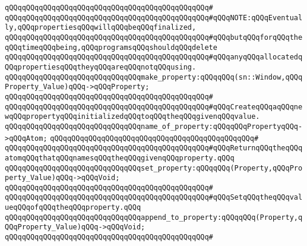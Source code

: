 \verb|qQQqqQQqqQQqqQQqqQQqqQQqqQQqqQQqqQQqqQQqqQQqqQQq#|\newline
\verb|qQQqqQQqqQQqqQQqqQQqqQQqqQQqqQQqqQQqqQQqqQQqqQQq#qQQqNOTE:qQQqEventually,qQQqpropertiesqQQqwillqQQqbeqQQqfinalized,|\newline
\verb|qQQqqQQqqQQqqQQqqQQqqQQqqQQqqQQqqQQqqQQqqQQqqQQq#qQQqbutqQQqforqQQqtheqQQqtimeqQQqbeing,qQQqprogramsqQQqshouldqQQqdelete|\newline
\verb|qQQqqQQqqQQqqQQqqQQqqQQqqQQqqQQqqQQqqQQqqQQqqQQq#qQQqanyqQQqallocatedqQQqpropertiesqQQqtheyqQQqareqQQqnotqQQqusing.|\newline
\newline
\newline
\verb|qQQqqQQqqQQqqQQqqQQqqQQqqQQqqQQqmake_property:qQQqqQQq(sn::Window,qQQqProperty_Value)qQQq->qQQqProperty;|\newline
\verb|qQQqqQQqqQQqqQQqqQQqqQQqqQQqqQQqqQQqqQQqqQQqqQQq#|\newline
\verb|qQQqqQQqqQQqqQQqqQQqqQQqqQQqqQQqqQQqqQQqqQQqqQQq#qQQqCreateqQQqaqQQqnewqQQqpropertyqQQqinitializedqQQqtoqQQqtheqQQqgivenqQQqvalue.|\newline
\newline
\newline
\newline
\verb|qQQqqQQqqQQqqQQqqQQqqQQqqQQqqQQqname_of_property:qQQqqQQqPropertyqQQq->qQQqAtom;|\newline
\verb|qQQqqQQqqQQqqQQqqQQqqQQqqQQqqQQqqQQqqQQqqQQqqQQq#|\newline
\verb|qQQqqQQqqQQqqQQqqQQqqQQqqQQqqQQqqQQqqQQqqQQqqQQq#qQQqReturnqQQqtheqQQqatomqQQqthatqQQqnamesqQQqtheqQQqgivenqQQqproperty.qQQq|\newline
\newline
\newline
\newline
\verb|qQQqqQQqqQQqqQQqqQQqqQQqqQQqqQQqset_property:qQQqqQQq(Property,qQQqProperty_Value)qQQq->qQQqVoid;|\newline
\verb|qQQqqQQqqQQqqQQqqQQqqQQqqQQqqQQqqQQqqQQqqQQqqQQq#|\newline
\verb|qQQqqQQqqQQqqQQqqQQqqQQqqQQqqQQqqQQqqQQqqQQqqQQq#qQQqSetqQQqtheqQQqvalueqQQqofqQQqtheqQQqproperty.qQQq|\newline
\newline
\newline
\verb|qQQqqQQqqQQqqQQqqQQqqQQqqQQqqQQqappend_to_property:qQQqqQQq(Property,qQQqProperty_Value)qQQq->qQQqVoid;|\newline
\verb|qQQqqQQqqQQqqQQqqQQqqQQqqQQqqQQqqQQqqQQqqQQqqQQq#|\newline
